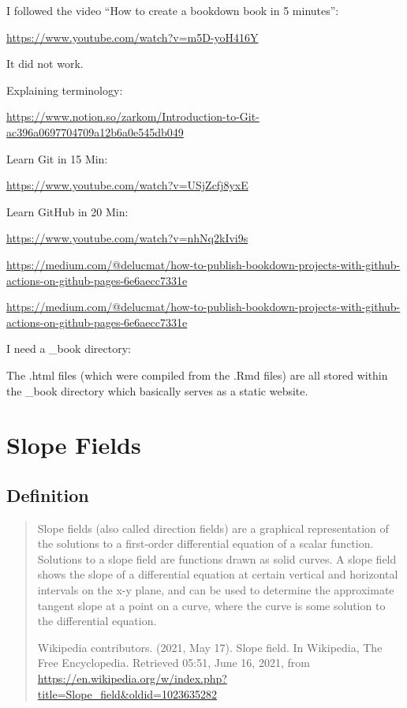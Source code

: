 \documentclass[
]{book}
\begin{document}
I followed the video ``How to create a bookdown book in 5 minutes'':

\url{https://www.youtube.com/watch?v=m5D-yoH416Y}

It did not work.

Explaining terminology:

\url{https://www.notion.so/zarkom/Introduction-to-Git-ac396a0697704709a12b6a0e545db049}

Learn Git in 15 Min:

\url{https://www.youtube.com/watch?v=USjZcfj8yxE}

Learn GitHub in 20 Min:

\url{https://www.youtube.com/watch?v=nhNq2kIvi9s}

\url{https://medium.com/@delucmat/how-to-publish-bookdown-projects-with-github-actions-on-github-pages-6e6aecc7331e}

\url{https://medium.com/@delucmat/how-to-publish-bookdown-projects-with-github-actions-on-github-pages-6e6aecc7331e}

I need a \_book directory:

The .html files (which were compiled from the .Rmd files) are all stored within the \_book directory which basically serves as a static website.

\hypertarget{slope-fields}{%
\chapter{Slope Fields}\label{slope-fields}}

\hypertarget{definition}{%
\section{Definition}\label{definition}}

\begin{quote}
Slope fields (also called direction fields) are a graphical representation of the solutions to a first-order differential equation of a scalar function. Solutions to a slope field are functions drawn as solid curves. A slope field shows the slope of a differential equation at certain vertical and horizontal intervals on the x-y plane, and can be used to determine the approximate tangent slope at a point on a curve, where the curve is some solution to the differential equation.

\hfill Wikipedia contributors. (2021, May 17). Slope field. In Wikipedia, The Free Encyclopedia. Retrieved 05:51, June 16, 2021, from \url{https://en.wikipedia.org/w/index.php?title=Slope_field\&oldid=1023635282}
\end{quote}
\end{document}
